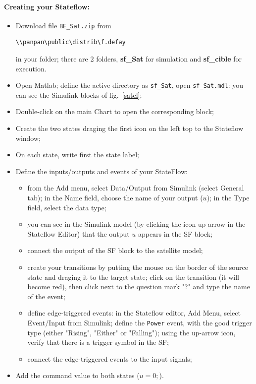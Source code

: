 \documentclass[a4paper]{article}
\begin{document}
\paragraph{Creating your Stateflow:}
\begin{itemize}
\item Download file {\tt BE\_Sat.zip} from \begin{verbatim}\\panpan\public\distrib\f.defay\end{verbatim} in your folder;
	there are 2 folders, {\bf sf\_Sat} for simulation and {\bf sf\_cible} for execution. 
\item Open Matlab; define the active directory as {\tt sf\_Sat}, open {\tt sf\_Sat.mdl}:
	you can see the Simulink blocks of fig.~\ref{satel};
\item Double-click on the main Chart to open the corresponding block;
\item Create the two states draging the first icon on the left top to the Stateflow window;
\item On each state, write first the state label;
\item Define the inputs/outputs and events of your StateFlow:
	\begin{itemize}
	\item from the Add menu, select Data/Output from Simulink (select General tab); in the Name field,
		choose the name of your output ($u$); in the Type field, select the data type;
	\item you can see in the Simulink model (by clicking the icon up-arrow in the Stateflow Editor)
		that the output $u$ appears in the SF block;
	\item connect the output of the SF block to the satellite model;
	\item create your transitions by putting the mouse on the border of the source state and draging it to the target state;
		click on the transition (it will become red), then click next to the question mark "?" and type the name of the event;
	\item define edge-triggered events: in the Stateflow editor, Add Menu, select Event/Input from Simulink;
		define the {\tt Power} event, with the good trigger type (either "Rising", "Either" or "Falling");
		using the up-arrow icon, verify	that there is a trigger symbol in the SF;
	\item connect the edge-triggered events to the input signals;
	\end{itemize}	
\item Add the command value to both states ($u=0;$).
\end{itemize}
\end{document}

